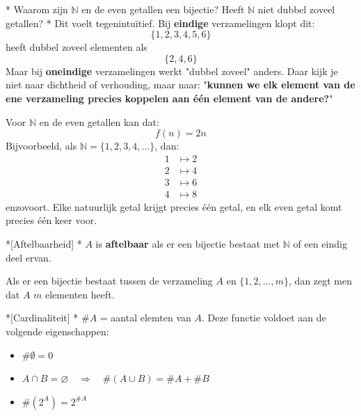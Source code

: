 \begin{nicenote}*
    Waarom zijn $\mathbb{N}$ en de even getallen een bijectie? Heeft $\mathbb{N}$ niet dubbel zoveel getallen?
    \nextpart[]*
    Dit voelt tegenintuïtief. Bij \textbf{eindige} verzamelingen klopt dit:
    \begin{equation*}
        \{1,2,3,4,5,6\}
    \end{equation*}
    heeft dubbel zoveel elementen als
    \begin{equation*}
        \{2,4,6\}
    \end{equation*}
    Maar bij \textbf{oneindige} verzamelingen werkt "dubbel zoveel" anders. Daar kijk je niet naar dichtheid of verhouding, maar naar: "\textbf{kunnen we elk element van de ene verzameling precies koppelen aan één element van de andere?}"

    \vspace{0.25cm}

    Voor $\mathbb{N}$ en de even getallen kan dat:
    \begin{equation*}
        f(n) = 2n
    \end{equation*}
    Bijvoorbeeld, als $\mathbb{N} = \{1,2,3,4,\dots\}$, dan:
    \begin{equation*}
        \begin{aligned}
            1 &\mapsto 2 \\
            2 &\mapsto 4 \\
            3 &\mapsto 6 \\
            4 &\mapsto 8 
        \end{aligned}
    \end{equation*}
    enzovoort. Elke natuurlijk getal krijgt precies één getal, en elk even getal komt precies één keer voor.
\end{nicenote}

\begin{nicedefinition}*[Aftelbaarheid]
    \nextpart[]*
    $A$ is \textcolor{PineGreen!75!black}{\textbf{aftelbaar}} als er een bijectie bestaat met $\mathbb{N}$ of een eindig deel ervan.

    \vspace{0.25cm}

    Als er een bijectie bestaat tussen de verzameling $A$ en $\{1,2,\dots,m\}$, dan zegt men dat $A$ $m$ elementen heeft.
\end{nicedefinition}

\begin{nicedefinition}*[Cardinaliteit]
    \nextpart[]*
    $\#A$ = aantal elemten van $A$. Deze functie voldoet aan de volgende eigenschappen:
    \begin{itemize}
        \item $\#\emptyset = 0$
        \item $A \cap B = \varnothing \quad \Rightarrow \quad \#(A \cup B) = \#A + \#B$
        \item $\#(2^A) = 2^{\#A}$
    \end{itemize}
\end{nicedefinition}

